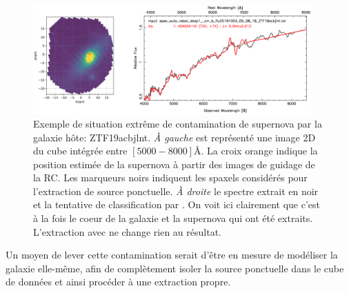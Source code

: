 \documentclass[../main/main.tex]{subfiles}
\begin{document}
\begin{figure}
  \centering
  \includegraphics[width=0.95\textwidth]{../figures/03_sedm/stronghost.png}
  \caption[Exemple de situation extrême de contamination de supernova
  par la galaxie hôte]{Exemple de situation extrême de contamination de
    supernova par la galaxie hôte: ZTF19acbjlnt. \textit{À gauche} est représenté
    une image 2D du cube intégrée entre $[5000-8000]$\AA. La croix
    orange indique la position estimée de la supernova à partir des
    images de guidage de la RC. Les marqueurs noirs indiquent les
    spaxels considérés pour l'extraction de source ponctuelle. \textit{À droite} le spectre extrait en
    noir et la tentative de classification par . On voit ici
    clairement que c'est à la fois le coeur de la galaxie et la
    supernova qui ont été extraits. L'extraction avec  ne
    change rien au résultat.}
  \label{fig:stronghost}
\end{figure}

Un moyen de lever cette contamination serait d'être en mesure de
modéliser la galaxie elle-même, afin de complètement isoler la source
ponctuelle dans le cube de données et ainsi procéder à une extraction
propre. 

%
%
\end{document}
